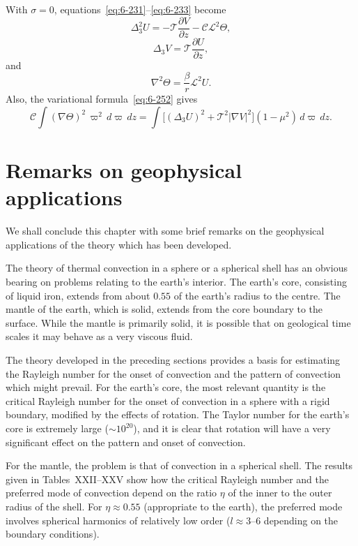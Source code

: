 With $\sigma = 0$, equations~\eqref{eq:6-231}--\eqref{eq:6-233} become
\begin{equation}\label{eq:6-257}
\Delta_3^2 U = -\mathscr{T}\frac{\partial V}{\partial z} - \mathcal{C}\mathscr{L}^2\Theta,
\end{equation}
\begin{equation}\label{eq:6-258}
\Delta_3 V = \mathscr{T}\frac{\partial U}{\partial z},
\end{equation}
and
\begin{equation}\label{eq:6-259}
\nabla^2\Theta = \frac{\beta}{r}\mathscr{L}^2 U.
\end{equation}
Also, the variational formula~\eqref{eq:6-252} gives
\begin{equation}\label{eq:6-260}
\mathcal{C}\!\int (\nabla\Theta)^2\,\varpi^2\,d\varpi\,dz = \int\bigl[(\Delta_3 U)^2 + \mathscr{T}^2|\nabla V|^2\bigr](1-\mu^2)\,d\varpi\,dz.
\end{equation}

\section{Remarks on geophysical applications}\label{sec:63}
We shall conclude this chapter with some brief remarks on the
geophysical applications of the theory which has been developed.

The theory of thermal convection in a sphere or a spherical shell
has an obvious bearing on problems relating to the earth's interior.
The earth's core, consisting of liquid iron, extends from about $0.55$
of the earth's radius to the centre. The mantle of the earth, which
is solid, extends from the core boundary to the surface. While the
mantle is primarily solid, it is possible that on geological time scales
it may behave as a very viscous fluid.

The theory developed in the preceding sections provides a basis for
estimating the Rayleigh number for the onset of convection and the
pattern of convection which might prevail. For the earth's core, the
most relevant quantity is the critical Rayleigh number for the onset
of convection in a sphere with a rigid boundary, modified by the
effects of rotation. The Taylor number for the earth's core is extremely
large ($\sim 10^{20}$), and it is clear that rotation will have a very
significant effect on the pattern and onset of convection.

For the mantle, the problem is that of convection in a spherical shell.
The results given in Tables~XXII--XXV show how the critical Rayleigh
number and the preferred mode of convection depend on the ratio
$\eta$ of the inner to the outer radius of the shell. For $\eta \approx 0.55$
(appropriate to the earth), the preferred mode involves spherical harmonics
of relatively low order ($l \approx 3$--$6$ depending on the boundary conditions).

